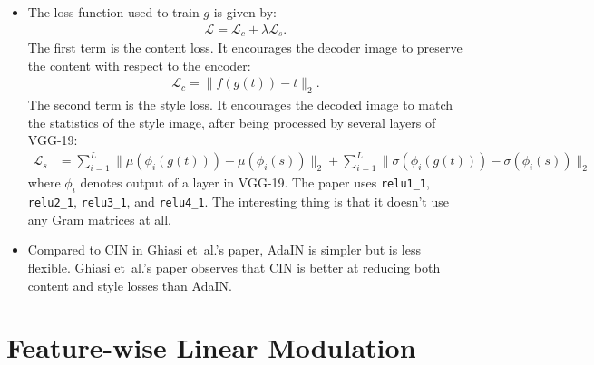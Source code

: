 \documentclass[10pt]{article}
\newcommand{\etal}{{et~al.}}
\begin{document}
\begin{itemize}
  	\item The loss function used to train $g$ is given by:
  	\begin{align*}
  		\mathcal{L} = \mathcal{L}_c + \lambda \mathcal{L}_s.
  	\end{align*}
  	The first term is the content loss. It encourages the decoder image to preserve the content with respect to the encoder:
  	\begin{align*}
  		\mathcal{L}_c = \| f(g(t)) - t \|_2.
  	\end{align*}
  	The second term is the style loss. It encourages the decoded image to match the statistics of the style image, after being processed by several layers of VGG-19:
  	\begin{align*}
  		\mathcal{L}_s
  		&= \sum_{i=1}^L \| \mu(\phi_i(g(t))) - \mu(\phi_i(s)) \|_2
  		+ \sum_{i=1}^L \| \sigma(\phi_i(g(t))) - \sigma(\phi_i(s)) \|_2
  	\end{align*}
  	where $\phi_i$ denotes output of a layer in VGG-19. The paper uses \texttt{relu1\_1}, \texttt{relu2\_1}, \texttt{relu3\_1}, and \texttt{relu4\_1}. The interesting thing is that it doesn't use any Gram matrices at all.

  	\item Compared to CIN in Ghiasi \etal's paper, AdaIN is simpler but is less flexible. Ghiasi \etal's paper observes that CIN is better at reducing both content and style losses than AdaIN.
  \end{itemize}

  \section{Feature-wise Linear Modulation}
\end{document}
